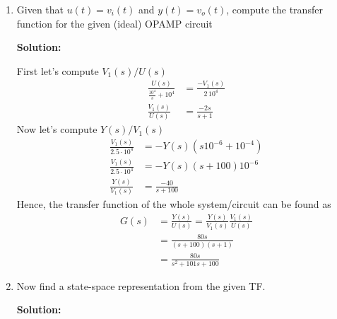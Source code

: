 \documentclass[twoside]{article}
\begin{document}
\begin{enumerate}
  \item Given that $u(t) = v_i(t)$ and $y(t) = v_o(t)$, compute the
    transfer function for the given (ideal) OPAMP circuit

\textbf{Solution:}

First let's compute $V_1(s)/U(s)$ 
%
\begin{align*}
\frac{U(s)}{ \frac{10^4}{s} + 10^4 } &= \frac{-V_1(s)}{ 2 \, 10^4} 
\\
\frac{V_1(s)}{U(s)} &= \frac{-2 s}{s + 1}
\end{align*}
%
Now let's compute $Y(s)/V_1(s)$ 
%
\begin{align*}
\frac{V_1(s)}{ 2.5 \cdot 10^4} &= -Y(s) \left( s 10^{-6} + 10^{-4} \right)
\\
\frac{V_1(s)}{ 2.5 \cdot 10^4} &= -Y(s) \left( s + 100 \right) 10^{-6}
\\
\frac{Y(s)}{V_1(s)} &= \frac{-40}{s + 100}
\end{align*}
%
Hence, the transfer function of the whole system/circuit can be found
as
%
\begin{align*}
G(s) &= \frac{Y(s)}{U(s)} = \frac{Y(s)}{V_1(s)} \frac{V_1(s)}{U(s)}
\\
&= \frac{80 s}{(s + 100) (s+1)}
\\
&= \frac{80 s}{s^2 + 101 s + 100}
\end{align*}

\item Now find a state-space representation from the given TF.

\textbf{Solution:}


\end{enumerate}
\end{document}
